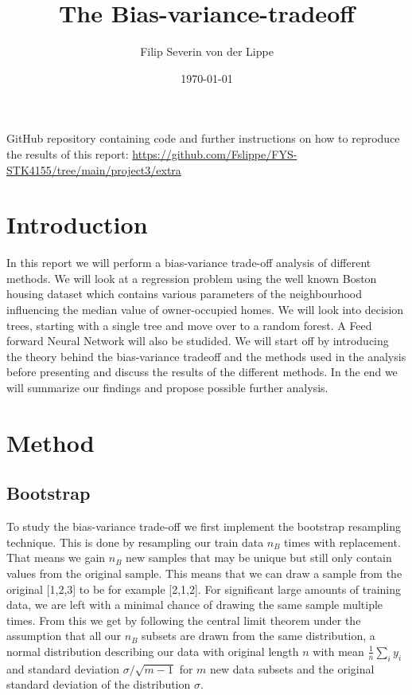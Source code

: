 \documentclass[11pt]{article}
\title{The Bias-variance-tradeoff}
\author{Filip Severin von der Lippe}
\date{\today}
\begin{document}
\maketitle
GitHub repository containing code and further instructions on how to reproduce the results of this report: \url{https://github.com/Fslippe/FYS-STK4155/tree/main/project3/extra}

\section{Introduction}
In this report we will perform a bias-variance trade-off analysis of different methods. We will look at a regression problem using the well known Boston housing dataset which contains various parameters of the neighbourhood influencing the median value of owner-occupied homes. We will look into decision trees, starting with a single tree and move over to a random forest. A Feed forward Neural Network will also be studided. We will start off by introducing the theory behind the bias-variance tradeoff and the methods used in the analysis before presenting and discuss the results of the different methods. In the end we will summarize our findings and propose possible further analysis.

\section{Method}
\subsection*{Bootstrap}

To study the bias-variance trade-off we first implement the bootstrap resampling technique. This is done by resampling our train data $n_B$ times with replacement. That means we gain $n_B$ new samples that may be unique but still only contain values from the original sample. This means that we can draw a sample from the original [1,2,3] to be for example [2,1,2]. For significant large amounts of training data, we are left with a minimal chance of drawing the same sample multiple times. From this we get by following the central limit theorem under the assumption that all our $n_B$ subsets are drawn from the same distribution, a normal distribution describing our data with original length $n$ with mean $\frac{1}{n}\sum_i y_i$
and standard deviation $\sigma/ \sqrt{m-1}$ for $m$ new data subsets and the original standard deviation of the distribution $\sigma$.
\end{document}
